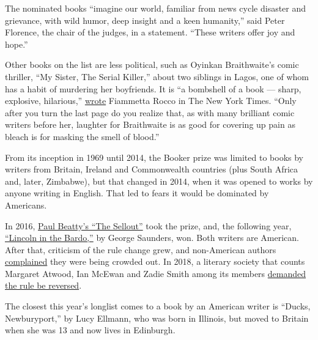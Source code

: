 The nominated books ``imagine our world, familiar from news cycle
disaster and grievance, with wild humor, deep insight and a keen
humanity,'' said Peter Florence, the chair of the judges, in a
statement. ``These writers offer joy and hope.''

Other books on the list are less political, such as Oyinkan
Braithwaite's comic thriller, ``My Sister, The Serial Killer,'' about
two siblings in Lagos, one of whom has a habit of murdering her
boyfriends. It is ``a bombshell of a book --- sharp, explosive,
hilarious,''
\href{https://www.nytimes3xbfgragh.onion/2019/01/09/books/review/oyinkan-braithwaite-my-sister-the-serial-killer.html?searchResultPosition=2}{wrote}
Fiammetta Rocco in The New York Times. ``Only after you turn the last
page do you realize that, as with many brilliant comic writers before
her, laughter for Braithwaite is as good for covering up pain as bleach
is for masking the smell of blood.''

From its inception in 1969 until 2014, the Booker prize was limited to
books by writers from Britain, Ireland and Commonwealth countries (plus
South Africa and, later, Zimbabwe), but that changed in 2014, when it
was opened to works by anyone writing in English. That led to fears it
would be dominated by Americans.

In 2016,
\href{https://www.nytimes3xbfgragh.onion/2016/10/26/business/media/paul-beatty-wins-man-booker-prize-with-the-sellout.html?module=inline}{Paul
Beatty's ``The Sellout''} took the prize, and, the following year,
\href{https://www.nytimes3xbfgragh.onion/2017/10/17/books/george-saunders-wins-man-booker-prize-lincoln-in-the-bardo.html?module=inline}{``Lincoln
in the Bardo,''} by George Saunders, won. Both writers are American.
After that, criticism of the rule change grew, and non-American authors
\href{https://www.nytimes3xbfgragh.onion/2018/03/30/world/europe/man-booker-prize-americans.html}{complained}
they were being crowded out. In 2018, a literary society that counts
Margaret Atwood, Ian McEwan and Zadie Smith among its members
\href{https://www.nytimes3xbfgragh.onion/2018/03/30/world/europe/man-booker-prize-americans.html?rref=collection\%2Ftimestopic\%2FMan\%20Booker\%20Prize\&action=click\&contentCollection=timestopics\&region=stream\&module=inline\&version=latest\&contentPlacement=3\&pgtype=collection}{demanded
the rule be reversed}.

The closest this year's longlist comes to a book by an American writer
is ``Ducks, Newburyport,'' by Lucy Ellmann, who was born in Illinois,
but moved to Britain when she was 13 and now lives in Edinburgh.


